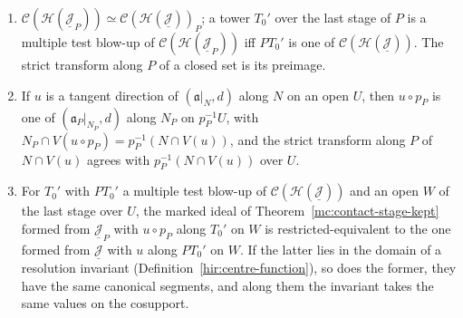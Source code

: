 \begin{theorem}
\begin{enumerate}
\item \(\mathcal C(\mathcal H(\underline{\mathcal J}_P))\simeq\mathcal C(\mathcal H(\underline{\mathcal J}))_P\); a tower \(T_0'\) over the last stage of \(P\) is a multiple test blow-up of
\(\mathcal C(\mathcal H(\underline{\mathcal J}_P))\) iff \(PT_0'\) is one of \(\mathcal C(\mathcal H(\underline{\mathcal J}))\). The strict transform along \(P\) of a closed set is its preimage.
\item If \(u\) is a tangent direction of \((\mathfrak a|_N,d)\) along \(N\) on an open \(U\), then \(u\circ p_P\) is one of \((\mathfrak a_P|_{N_P},d)\) along \(N_P\) on \(p_P^{-1}U\),
with \(N_P\cap V(u\circ p_P)=p_P^{-1}(N\cap V(u))\), and the strict transform along \(P\) of \(N\cap V(u)\) agrees with \(p_P^{-1}(N\cap V(u))\) over \(U\).
\item For \(T_0'\) with \(PT_0'\) a multiple test blow-up of \(\mathcal C(\mathcal H(\underline{\mathcal J}))\) and an open \(W\) of the last stage over \(U\), the marked ideal of
Theorem~\ref{mc:contact-stage-kept} formed from \(\underline{\mathcal J}_P\) with \(u\circ p_P\) along \(T_0'\) on \(W\) is restricted-equivalent to the one formed from
\(\underline{\mathcal J}\) with \(u\) along \(PT_0'\) on \(W\). If the latter lies in the domain of a resolution invariant (Definition~\ref{hir:centre-function}), so does the former,
they have the same canonical segments, and along them the invariant takes the same values on the cosupport.
\end{enumerate}
\end{theorem}
